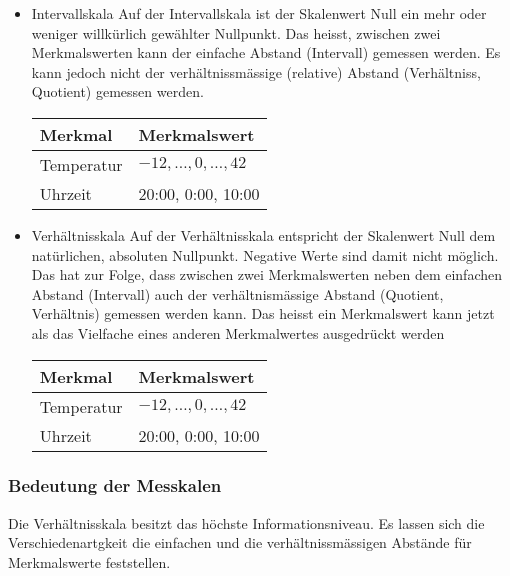 \begin{itemize}
\item Intervallskala
\subitem Auf der Intervallskala ist der Skalenwert Null ein mehr oder weniger willkürlich gewählter Nullpunkt. Das heisst, zwischen zwei Merkmalswerten kann der einfache Abstand (Intervall) gemessen werden. Es kann jedoch nicht der verhältnissmässige (relative) Abstand (Verhältniss, Quotient) gemessen werden.
\begin{table}[ht]
\centering
\begin{tabular}{@{}ll@{}}
\toprule
Merkmal & Merkmalswert \\ \midrule
Temperatur & $-12, \ldots, 0, \ldots, 42$ \\
Uhrzeit & 20:00, 0:00, 10:00 \\ \bottomrule
\end{tabular}
\end{table}
\item Verhältnisskala
\subitem
Auf der Verhältnisskala entspricht der Skalenwert Null dem natürlichen, absoluten Nullpunkt. Negative Werte sind damit nicht möglich. Das hat zur Folge, dass zwischen zwei Merkmalswerten neben dem einfachen Abstand (Intervall) auch der verhältnismässige Abstand (Quotient, Verhältnis) gemessen werden kann. Das heisst ein Merkmalswert kann jetzt als das Vielfache eines anderen Merkmalwertes ausgedrückt werden
\begin{table}[ht]
\centering
\begin{tabular}{@{}ll@{}}
\toprule
Merkmal & Merkmalswert \\ \midrule
Temperatur & $-12, \ldots, 0, \ldots, 42$ \\
Uhrzeit & 20:00, 0:00, 10:00 \\ \bottomrule
\end{tabular}
\end{table}
\end{itemize}
\subsubsection{Bedeutung der Messkalen}
\begin{tcolorbox}[colback=green!5,colframe=green!40!black, title=Bedeutung der Messskalen]
Die Verhältnisskala besitzt das höchste Informationsniveau. Es lassen sich die Verschiedenartgkeit die einfachen und die verhältnissmässigen Abstände für Merkmalswerte feststellen.
\end{tcolorbox}
